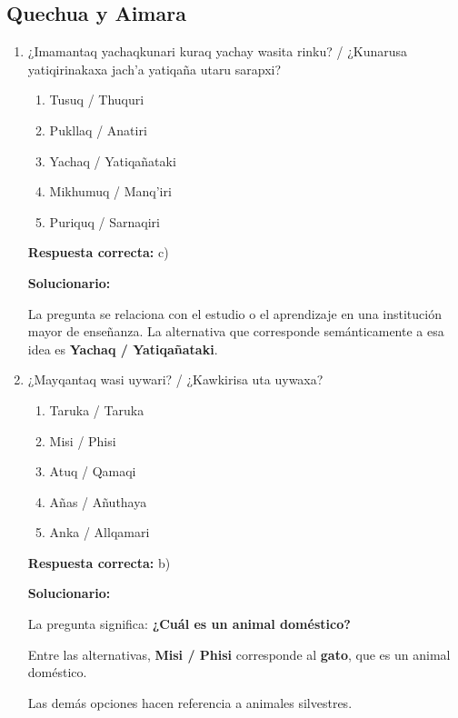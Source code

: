 \subsection*{Quechua y Aimara}

\begin{enumerate}[resume]
	
	\item ¿Imamantaq yachaqkunari kuraq yachay wasita rinku? / ¿Kunarusa yatiqirinakaxa jach'a yatiqaña utaru sarapxi?
	\begin{enumerate}[label=\alph*)]
		\item Tusuq / Thuquri
		\item Pukllaq / Anatiri
		\item Yachaq / Yatiqañataki
		\item Mikhumuq / Manq'iri
		\item Puriquq / Sarnaqiri
	\end{enumerate}
	\textbf{Respuesta correcta:} c)
	
	\vspace{2mm}
	\textbf{Solucionario:}
	
	La pregunta se relaciona con el estudio o el aprendizaje en una institución mayor de enseñanza. La alternativa que corresponde semánticamente a esa idea es \textbf{Yachaq / Yatiqañataki}.
	
	\vspace{6mm}
	
	\item ¿Mayqantaq wasi uywari? / ¿Kawkirisa uta uywaxa?
	\begin{enumerate}[label=\alph*)]
		\item Taruka / Taruka
		\item Misi / Phisi
		\item Atuq / Qamaqi
		\item Añas / Añuthaya
		\item Anka / Allqamari
	\end{enumerate}
	\textbf{Respuesta correcta:} b)
	
	\vspace{2mm}
	\textbf{Solucionario:}
	
	La pregunta significa: \textbf{¿Cuál es un animal doméstico?}
	
	Entre las alternativas, \textbf{Misi / Phisi} corresponde al \textbf{gato}, que es un animal doméstico.
	
	Las demás opciones hacen referencia a animales silvestres.
	
	\vspace{6mm}
\end{enumerate}

